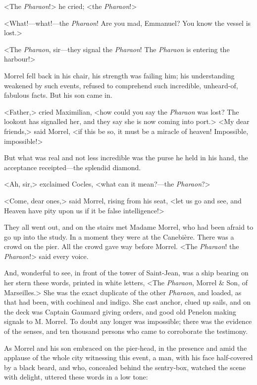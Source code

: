 <The \textit{Pharaon}!> he cried; <the \textit{Pharaon}!> 

 <What!—what!—the \textit{Pharaon}! Are you mad, Emmanuel? You know the vessel is lost.> 

 <The \textit{Pharaon}, sir—they signal the \textit{Pharaon}! The \textit{Pharaon} is entering the harbour!> 

 Morrel fell back in his chair, his strength was failing him; his understanding weakened by such events, refused to comprehend such incredible, unheard-of, fabulous facts. But his son came in. 

 <Father,> cried Maximilian, <how could you say the \textit{Pharaon} was lost? The lookout has signalled her, and they say she is now coming into port.>  <My dear friends,> said Morrel, <if this be so, it must be a miracle of heaven! Impossible, impossible!> 

 But what was real and not less incredible was the purse he held in his hand, the acceptance receipted—the splendid diamond. 

 <Ah, sir,> exclaimed Cocles, <what can it mean?—the \textit{Pharaon}?> 

 <Come, dear ones,> said Morrel, rising from his seat, <let us go and see, and Heaven have pity upon us if it be false intelligence!> 

 They all went out, and on the stairs met Madame Morrel, who had been afraid to go up into the study. In a moment they were at the Canebière. There was a crowd on the pier. All the crowd gave way before Morrel. <The \textit{Pharaon}! the \textit{Pharaon}!> said every voice. 

 And, wonderful to see, in front of the tower of Saint-Jean, was a ship bearing on her stern these words, printed in white letters, <The \textit{Pharaon}, Morrel \& Son, of Marseilles.> She was the exact duplicate of the other \textit{Pharaon}, and loaded, as that had been, with cochineal and indigo. She cast anchor, clued up sails, and on the deck was Captain Gaumard giving orders, and good old Penelon making signals to M. Morrel. To doubt any longer was impossible; there was the evidence of the senses, and ten thousand persons who came to corroborate the testimony. 

 As Morrel and his son embraced on the pier-head, in the presence and amid the applause of the whole city witnessing this event, a man, with his face half-covered by a black beard, and who, concealed behind the sentry-box, watched the scene with delight, uttered these words in a low tone: 

